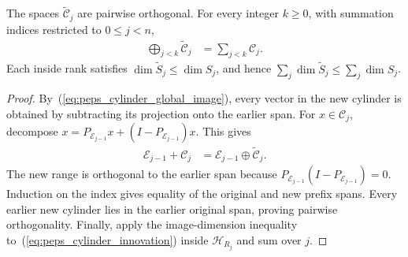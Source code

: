 \begin{lemma}
    \label{thm:peps_nested_cylinder_orthogonalization}
    \leanok
    The spaces $\widetilde{\mathcal C}_j$ are pairwise orthogonal. For every
    integer $k\geq0$, with summation indices restricted to $0\leq j<n$,
    \begin{align}
        \bigoplus_{j<k}\widetilde{\mathcal C}_j
         & =\sum_{j<k}\mathcal C_j.
        \label{eq:peps_cylinder_prefix}
    \end{align}
    Each inside rank satisfies $\dim\widetilde S_j\leq\dim S_j$, and hence
    $\sum_j\dim\widetilde S_j\leq\sum_j\dim S_j$.
\end{lemma}
\begin{proof}
    \leanok
    By~(\ref{eq:peps_cylinder_global_image}), every vector in the new
    cylinder is obtained by subtracting its projection onto the earlier span.
    For $x\in\mathcal C_j$, decompose
    $x=P_{\mathcal E_{j-1}}x+(I-P_{\mathcal E_{j-1}})x$. This gives
    \begin{align}
        \mathcal E_{j-1}+\mathcal C_j
         & =\mathcal E_{j-1}\mathbin{\oplus}\widetilde{\mathcal C}_j.
        \label{eq:peps_cylinder_global_split}
    \end{align}
    The new range is orthogonal to the earlier span because
    $P_{\mathcal E_{j-1}}(I-P_{\mathcal E_{j-1}})=0$.
    Induction on the index gives equality of the original and new prefix
    spans. Every earlier new cylinder lies in the earlier original span,
    proving pairwise orthogonality. Finally, apply the image-dimension
    inequality to~(\ref{eq:peps_cylinder_innovation}) inside $\mathcal H_{R_j}$
    and sum over $j$.
\end{proof}

